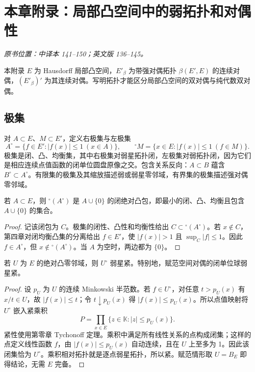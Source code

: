 \section*{本章附录：局部凸空间中的弱拓扑和对偶性}
\label{app:yosida-05}
\noindent\textit{原书位置：中译本 141--150；英文版 136--145。}

本附录 $E$ 为 Hausdorff 局部凸空间，$E'_\beta$ 为带强对偶拓扑 $\beta(E',E)$ 的连续对偶，$(E'_\beta)'$ 为其连续对偶。写明拓扑才能区分局部凸空间的双对偶与纯代数双对偶。

\subsection*{极集}
\label{sec:yosida-05-app-01}
对 $A\subset E$、$M\subset E'$，定义右极集与左极集
\[
 A^\circ=\{f\in E':|f(x)|\le1\ (x\in A)\},\qquad
 {}^\circ M=\{x\in E:|f(x)|\le1\ (f\in M)\}.
\]
极集是闭、凸、均衡集，其中右极集对弱星拓扑闭，左极集对弱拓扑闭，因为它们是相应连续点值函数的闭单位圆盘原像之交。包含关系反向：$A\subset B$ 蕴含 $B^\circ\subset A^\circ$。有限集的极集及其缩放描述弱或弱星零邻域，有界集的极集描述强对偶零邻域。

\begin{theorem}[双极定理]\label{thm:y5-bipolar}
若 $A\subset E$，则 ${}^\circ(A^\circ)$ 是 $A\cup\{0\}$ 的闭绝对凸包，即最小的闭、凸、均衡且包含 $A\cup\{0\}$ 的集合。
\end{theorem}
\begin{proof}
记该闭包为 $C$。极集的闭性、凸性和均衡性给出 $C\subset{}^\circ(A^\circ)$。若 $x\notin C$，第四章对闭均衡凸集的分离给出 $f\in E'$，使 $|f(x)|>1$ 且 $\sup_C|f|\le1$。因此 $f\in A^\circ$，但 $x\notin{}^\circ(A^\circ)$。当 $A$ 为空时，两边都为 $\{0\}$。
\end{proof}

\begin{theorem}\label{thm:y5-alaoglu}
若 $U$ 为 $E$ 的绝对凸零邻域，则 $U^\circ$ 弱星紧。特别地，赋范空间对偶的闭单位球弱星紧。
\end{theorem}
\begin{proof}
设 $p_U$ 为 $U$ 的连续 Minkowski 半范数。若 $f\in U^\circ$，对任意 $t>p_U(x)$ 有 $x/t\in U$，故 $|f(x)|\le t$；令 $t\downarrow p_U(x)$ 得 $|f(x)|\le p_U(x)$。所以点值映射将 $U^\circ$ 嵌入紧乘积
\[
 P=\prod_{x\in E}\{z\in\mathbb K:|z|\le p_U(x)\}.
\]
紧性使用第零章 Tychonoff 定理。乘积中满足所有线性关系的点构成闭集；这样的点定义线性函数 $f$，由 $|f(x)|\le p_U(x)$ 自动连续，且在 $U$ 上至多为 1。因此该闭集恰为 $U^\circ$。乘积相对拓扑就是逐点弱星拓扑，所以紧。赋范情形取 $U=B_E$ 即得结论，无需 $E$ 完备。
\end{proof}

